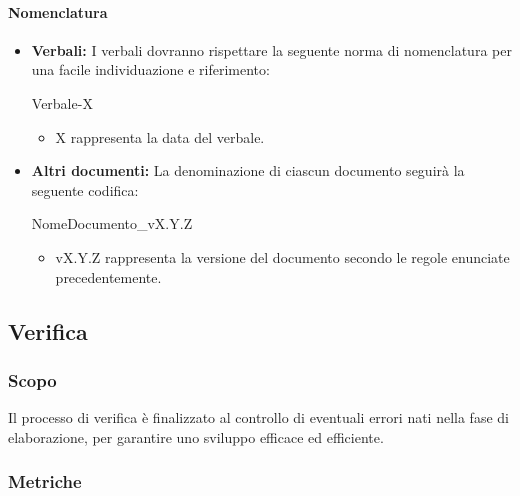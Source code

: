 \documentclass[11pt,a4paper]{article}
\begin{document}
\paragraph{Nomenclatura}

\begin{itemize}
\item \textbf{Verbali:} I verbali dovranno rispettare la seguente norma di nomenclatura per una facile individuazione e riferimento:
\begin{center}
	Verbale-X
\end{center}

\begin{itemize}
	\item X rappresenta la data del verbale.
\end{itemize}

\item \textbf{Altri documenti:} La denominazione di ciascun documento seguirà la seguente codifica:
\begin{center}
	NomeDocumento\_vX.Y.Z
\end{center}

\begin{itemize}
	\item vX.Y.Z rappresenta la versione del documento secondo le regole enunciate precedentemente.
\end{itemize}

\end{itemize}

\newpage

\subsection{Verifica}

\subsubsection{Scopo}
Il processo di verifica è finalizzato al controllo di eventuali errori nati nella fase di elaborazione, per garantire uno sviluppo efficace ed efficiente.



\subsubsection{Metriche}
\end{document}
